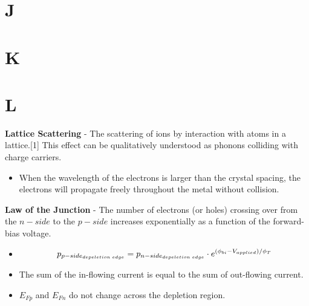 \section{J}
\section{K}
\section{L}
    \textbf{Lattice Scattering} - The scattering of ions by interaction with atoms in a lattice.[1] This effect can be qualitatively understood as phonons colliding with charge carriers.
    \vspace{0.15cm}
    \begin{itemize}
        \setlength\itemsep{0.5em}
        \item{When the wavelength of the electrons is larger than the crystal spacing, the electrons will propagate freely throughout the metal without collision.}
    \end{itemize}
\vspace{0.5cm}
    \textbf{Law of the Junction} - The number of electrons (or holes) crossing over from the $n-side$ to the $p-side$ increases exponentially as a function of the forward-bias voltage.
    \vspace{0.15cm}
    \begin{itemize}
        \setlength\itemsep{0.5em}
        \item{
            \begin{equation}
                \large{p_{p-side_{depeletion\;edge}} = p_{n-side_{depeletion\;edge}} \cdot e^{(\phi_{bi} - V_{applied}) / \phi_T}}
            \end{equation}
            }
        \item{The sum of the in-flowing current is equal to the sum of out-flowing current.}
        \item{$E_{Fp}$ and $E_{Fn}$ do not change across the depletion region.}
    \end{itemize}
